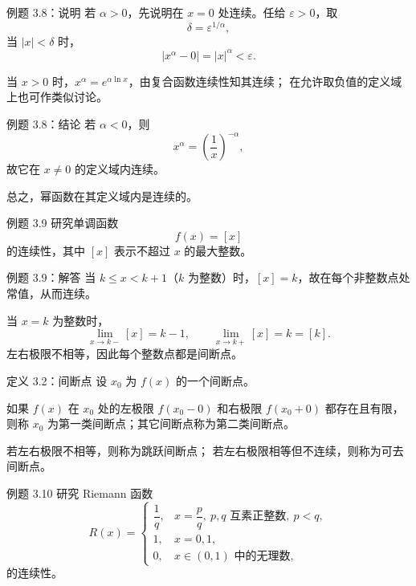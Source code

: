 ﻿\documentclass[aspectratio=169,11pt]{ctexbeamer}
\begin{document}
\begin{frame}{例题 3.8：说明}
若 $\alpha>0$，先说明在 $x=0$ 处连续。任给 $\varepsilon>0$，取
\[
  \delta=\varepsilon^{1/\alpha},
\]
当 $|x|<\delta$ 时，
\[
  |x^\alpha-0|=|x|^\alpha<\varepsilon.
\]

\vspace{0.6em}
当 $x>0$ 时，$x^\alpha=e^{\alpha\ln x}$，由复合函数连续性知其连续；
在允许取负值的定义域上也可作类似讨论。
\end{frame}

\begin{frame}{例题 3.8：结论}
若 $\alpha<0$，则
\[
  x^\alpha=\left(\frac1x\right)^{-\alpha},
\]
故它在 $x\ne 0$ 的定义域内连续。

\vspace{0.6em}
总之，幂函数在其定义域内是连续的。
\end{frame}

\begin{frame}{例题 3.9}
研究单调函数
\[
  f(x)=[x]
\]
的连续性，其中 $[x]$ 表示不超过 $x$ 的最大整数。
\end{frame}

\begin{frame}{例题 3.9：解答}
当 $k\le x<k+1$（$k$ 为整数）时，$[x]=k$，故在每个非整数点处常值，从而连续。

\vspace{0.6em}
当 $x=k$ 为整数时，
\[
  \lim_{x\to k-}[x]=k-1,\qquad \lim_{x\to k+}[x]=k=[k].
\]
左右极限不相等，因此每个整数点都是间断点。
\end{frame}

\begin{frame}{定义 3.2：间断点}
设 $x_0$ 为 $f(x)$ 的一个间断点。

\vspace{0.6em}
如果 $f(x)$ 在 $x_0$ 处的左极限 $f(x_0-0)$ 和右极限 $f(x_0+0)$ 都存在且有限，则称 $x_0$ 为第一类间断点；其它间断点称为第二类间断点。

\vspace{0.6em}
若左右极限不相等，则称为跳跃间断点；
若左右极限相等但不连续，则称为可去间断点。
\end{frame}

\begin{frame}{例题 3.10}
研究 Riemann 函数
\[
R(x)=
\begin{cases}
\dfrac1q, & x=\dfrac{p}{q},\ p,q\text{ 互素正整数},\ p<q,\\
1, & x=0,1,\\
0, & x\in(0,1)\text{ 中的无理数},
\end{cases}
\]
的连续性。
\end{frame}
\end{document}
